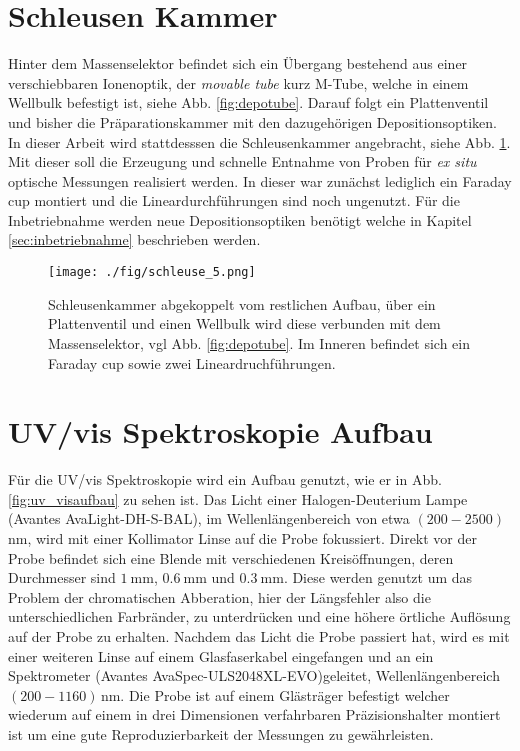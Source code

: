 \section{Schleusen Kammer}
\label{sec:schleuse}
Hinter dem Massenselektor befindet sich ein Übergang bestehend aus einer verschiebbaren Ionenoptik, der \textit{movable tube} kurz M-Tube, welche in einem Wellbulk befestigt ist, siehe Abb. \ref{fig:depotube}.
Darauf folgt ein Plattenventil und bisher die Präparationskammer mit den dazugehörigen Depositionsoptiken.
In dieser Arbeit wird stattdesssen die Schleusenkammer angebracht, siehe Abb. \ref{fig:schleuse}.
Mit dieser soll die Erzeugung und schnelle Entnahme von Proben für \textit{ex situ} optische Messungen realisiert werden.
In dieser war zunächst lediglich ein Faraday cup montiert und die Lineardurchführungen sind noch ungenutzt.
Für die Inbetriebnahme werden neue Depositionsoptiken benötigt welche in Kapitel \ref{sec:inbetriebnahme} beschrieben werden.

\begin{figure}
    \centering
    \texttt{[image: ./fig/schleuse\_5.png]}
    \caption{Schleusenkammer abgekoppelt vom restlichen Aufbau, über ein Plattenventil und einen Wellbulk wird diese verbunden mit dem Massenselektor, vgl Abb. \ref{fig:depotube}. Im Inneren befindet sich ein Faraday cup sowie zwei Lineardruchführungen.}
    \label{fig:schleuse}
\end{figure}


\section{UV/vis Spektroskopie Aufbau}
Für die UV/vis Spektroskopie wird ein Aufbau genutzt, wie er in Abb. \ref{fig:uv_visaufbau} zu sehen ist.
Das Licht einer Halogen-Deuterium Lampe (Avantes
AvaLight-DH-S-BAL), im Wellenlängenbereich von etwa $(200-2500)\,$nm, wird mit einer Kollimator Linse auf die Probe fokussiert.
Direkt vor der Probe befindet sich eine Blende mit verschiedenen Kreisöffnungen, deren Durchmesser sind $\SI{1}{\milli\meter}$, $\SI{0,6}{\milli\meter}$ und $\SI{0,3}{\milli\meter}$.
Diese werden genutzt um das Problem der chromatischen Abberation, hier der Längsfehler also die unterschiedlichen Farbränder, zu unterdrücken und eine höhere örtliche Auflösung auf der Probe zu erhalten.
Nachdem das Licht die Probe passiert hat, wird es mit einer weiteren Linse auf einem Glasfaserkabel eingefangen und an ein Spektrometer (Avantes AvaSpec-ULS2048XL-EVO)geleitet, Wellenlängenbereich $(200-1160)\,$nm.
Die Probe ist auf einem Glästräger befestigt welcher wiederum auf einem in drei Dimensionen verfahrbaren Präzisionshalter montiert ist um eine gute Reproduzierbarkeit der Messungen zu gewährleisten.\\


